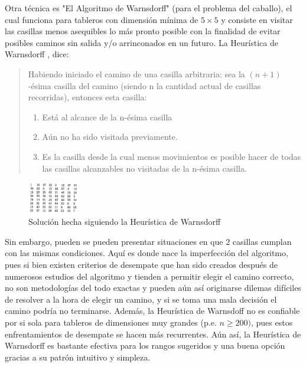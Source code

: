 \documentclass[journal, 10pt]{IEEEtran}
\begin{document}
Otra técnica es "El Algoritmo de Warnsdorff" (para el problema del caballo), el cual funciona para tableros con dimensión mínima de $5\times 5$ y consiste en visitar las casillas menos asequibles lo más pronto posible con la finalidad de evitar posibles caminos sin salida y/o arrinconados en un futuro. La Heurística de Warnsdorff \cite{Squirrel:1996}, dice:
\begin{quote}
	Habiendo iniciado el camino de una casilla arbitraria: sea la $(n+1)$-ésima casilla del camino (siendo n la cantidad actual de casillas recorridas), entonces esta casilla:
	\begin{enumerate}
		\item Está al alcance de la n-ésima casilla
		\item Aún no ha sido visitada previamente.
		\item Es la casilla desde la cual menos movimientos es posible hacer de todas las casillas alcanzables no visitadas de la n-ésima casilla.
\end{enumerate}
\end{quote}

\begin{figure}[h]
\centering
\includegraphics[width=0.2\textwidth]{figures/warnsdorff.png}
\caption{Soluci\'on hecha siguiendo la Heurística de Warnsdorff}
\label{fig:warnsdorff}
\end{figure}
Sin embargo, pueden se pueden presentar situaciones en que 2 casillas cumplan con las mismas condiciones. Aquí es donde nace la imperfección del algoritmo, pues si bien existen criterios de desempate que han sido creados después de numerosos estudios del algoritmo y tienden a permitir elegir el camino correcto, no son metodologías del todo exactas y pueden aún así originarse dilemas difíciles de resolver a la hora de elegir un camino, y si se toma una mala decisión el camino podría no terminarse. Además, la Heurística de Warnsdoff no es confiable por si sola para tableros de dimensiones muy grandes (p.e. $n \geq 200)$, pues estos enfrentamientos de desempate se hacen más recurrentes. Aún así, la Heurística de Warnsdorff es bastante efectiva para los rangos sugeridos y una buena opción gracias a su patrón intuitivo y simpleza.   
\end{document}
